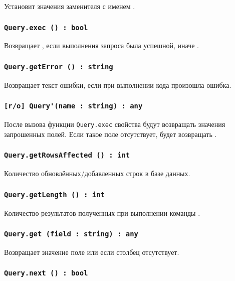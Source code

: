 Установит значения заменителя с именем .

\subsubsection{\lstinline|Query.exec () : bool|}

Возвращает \true, если выполнения запроса была успешной, иначе \false.

\subsubsection{\lstinline|Query.getError () : string|}

Возвращает текст ошибки, если при выполнении кода произошла ошибка.

\subsubsection{\lstinline|[r/o] Query'(name : string) : any|}

После вызова функции \lstinline|Query.exec| свойства будут возвращать значения запрошенных полей. Если такое поле отсутствует, будет возвращать \void.

\subsubsection{\lstinline|Query.getRowsAffected () : int|}

Количество обновлённых/добавленных строк в базе данных.

\subsubsection{\lstinline|Query.getLength () : int|}

Количество результатов полученных при выполнении команды .

\subsubsection{\lstinline|Query.get (field : string) : any|}

Возвращает значение поле или \void{} если столбец  отсутствует.

\subsubsection{\lstinline|Query.next () : bool|}

